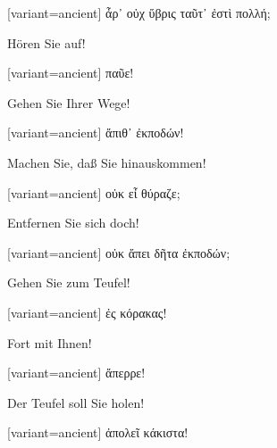 \begin{greek}[variant=ancient]%
ἆρ᾽ οὐχ ὕβρις ταῦτ᾽ ἐστὶ πολλή;

\end{greek}%
\switchcolumn*

Hören Sie auf! 

\switchcolumn

\begin{greek}[variant=ancient]%
παῦε!

\end{greek}%
\switchcolumn*

Gehen Sie Ihrer Wege! 

\switchcolumn

\begin{greek}[variant=ancient]%
ἄπιθ᾽ ἐκποδών!

\end{greek}%
\switchcolumn*

Machen Sie, daß Sie hinaus\textcompwordmark{}kommen! 

\switchcolumn

\begin{greek}[variant=ancient]%
οὐκ εἶ θύραζε;

\end{greek}%
\switchcolumn*

Entfernen Sie sich doch! 

\switchcolumn

\begin{greek}[variant=ancient]%
οὐκ ἄπει δῆτα ἐκποδών;

\end{greek}%
\switchcolumn*

Gehen Sie zum Teufel! 

\switchcolumn

\begin{greek}[variant=ancient]%
ἐς κόρακας!

\end{greek}%
\switchcolumn*

Fort mit Ihnen! 

\switchcolumn

\begin{greek}[variant=ancient]%
ἄπερρε!

\end{greek}%
\switchcolumn*

Der Teufel soll Sie holen! 

\switchcolumn

\begin{greek}[variant=ancient]%
ἀπολεῖ κάκιστα!

\end{greek}%
\switchcolumn*


